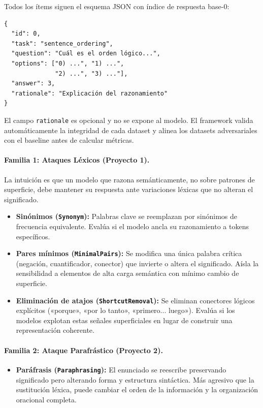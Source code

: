 \documentclass[11pt]{article}
\begin{document}
Todos los ítems siguen el esquema JSON con índice de respuesta base-0:

\begin{verbatim}
{
  "id": 0,
  "task": "sentence_ordering",
  "question": "Cuál es el orden lógico...",
  "options": ["0) ...", "1) ...",
              "2) ...", "3) ..."],
  "answer": 3,
  "rationale": "Explicación del razonamiento"
}
\end{verbatim} 

El campo \texttt{rationale} es opcional y no se expone al modelo. El
framework valida automáticamente la integridad de cada dataset y alinea
los datasets adversariales con el baseline antes de calcular métricas.


\paragraph{Familia 1: Ataques Léxicos (Proyecto 1).}
 
La intuición es que un modelo que razona semánticamente, no sobre
patrones de superficie, debe mantener su respuesta ante variaciones
léxicas que no alteran el significado.
 
\begin{itemize}
  \item \textbf{Sinónimos (\texttt{Synonym}):} Palabras clave se
  reemplazan por sinónimos de frecuencia equivalente. Evalúa si el
  modelo ancla su razonamiento a tokens específicos.
 
  \item \textbf{Pares mínimos (\texttt{MinimalPairs}):} Se modifica
  una única palabra crítica (negación, cuantificador, conector) que
  invierte o altera el significado. Aísla la sensibilidad a elementos
  de alta carga semántica con mínimo cambio de superficie.
 
  \item \textbf{Eliminación de atajos (\texttt{ShortcutRemoval}):}
  Se eliminan conectores lógicos explícitos («porque», «por lo tanto»,
  «primero... luego»). Evalúa si los modelos explotan estas señales
  superficiales en lugar de construir una representación coherente.
\end{itemize}
 
\paragraph{Familia 2: Ataque Parafrástico (Proyecto 2).}
 
\begin{itemize}
  \item \textbf{Paráfrasis (\texttt{Paraphrasing}):} El enunciado se
  reescribe preservando significado pero alterando forma y estructura
  sintáctica. Más agresivo que la sustitución léxica, puede cambiar
  el orden de la información y la organización oracional completa.
\end{itemize}
 
\end{document}
